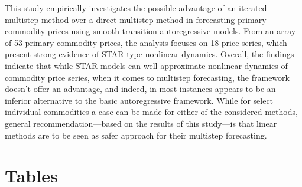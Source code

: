 \documentclass[11pt]{article}
\begin{document}
This study empirically investigates the possible advantage of an iterated multistep method over a direct multistep method in forecasting primary commodity prices using smooth transition autoregressive models. From an array of 53 primary commodity prices, the analysis focuses on 18 price series, which present strong evidence of STAR-type nonlinear dynamics. Overall, the findings indicate that while STAR models can well approximate nonlinear dynamics of commodity price series, when it comes to multistep forecasting, the framework doesn't offer an advantage, and indeed, in most instances appears to be an inferior alternative to the basic autoregressive framework. While for select individual commodities a case can be made for either of the considered methods, general recommendation---based on the results of this study---is that linear methods are to be seen as safer approach for their multistep forecasting.


\newpage
\singlespacing



\newpage
\onehalfspacing
\appendix

\setcounter{table}{0}
\renewcommand{\thetable}{A\arabic{table}}

\setcounter{figure}{0}
\renewcommand{\thefigure}{A\arabic{figure}}

\section{Tables}
\end{document}
